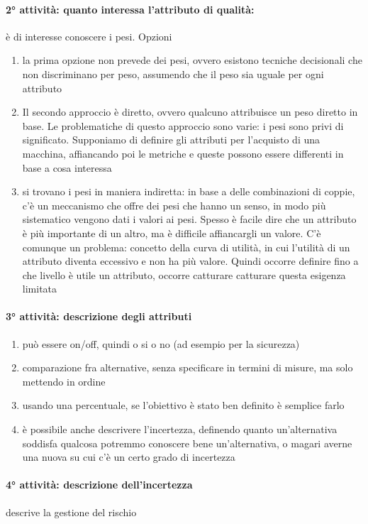\documentclass{article}
\begin{document}
\paragraph{2° attività: quanto interessa l'attributo di qualità:}è di interesse conoscere i pesi. Opzioni
\begin{enumerate}
\item la prima opzione non prevede dei pesi, ovvero esistono tecniche decisionali che non discriminano per peso, assumendo che il peso sia uguale per ogni attributo 
\item Il secondo approccio è diretto, ovvero qualcuno attribuisce un peso diretto in base. Le problematiche di questo approccio sono varie: i pesi sono privi di significato. Supponiamo di definire gli attributi per l'acquisto di una macchina, affiancando poi le metriche e queste possono essere differenti in base a cosa interessa
\item si trovano i pesi in maniera indiretta: in base a delle combinazioni di coppie, c'è un meccanismo che offre dei pesi che hanno un senso, in modo più sistematico vengono dati i valori ai pesi. Spesso è facile dire che un attributo è più importante di un altro, ma è difficile affiancargli un valore. C'è comunque un problema: concetto della curva di utilità, in cui l'utilità di un attributo diventa eccessivo e non ha più valore. Quindi occorre definire fino a che livello è utile un attributo, occorre catturare catturare questa esigenza limitata
\end{enumerate}
\paragraph{3° attività: descrizione degli attributi}
\begin{enumerate}
\item può essere on/off, quindi o si o no (ad esempio per la sicurezza)
\item comparazione fra alternative, senza specificare in termini di misure, ma solo mettendo in ordine
\item usando una percentuale, se l'obiettivo è stato ben definito è semplice farlo
\item è possibile anche descrivere l'incertezza, definendo quanto un'alternativa soddisfa qualcosa potremmo conoscere bene un'alternativa, o magari averne una nuova su cui c'è un certo grado di incertezza
\end{enumerate}
\paragraph{4° attività: descrizione dell'incertezza}descrive la gestione del rischio
\end{document}
